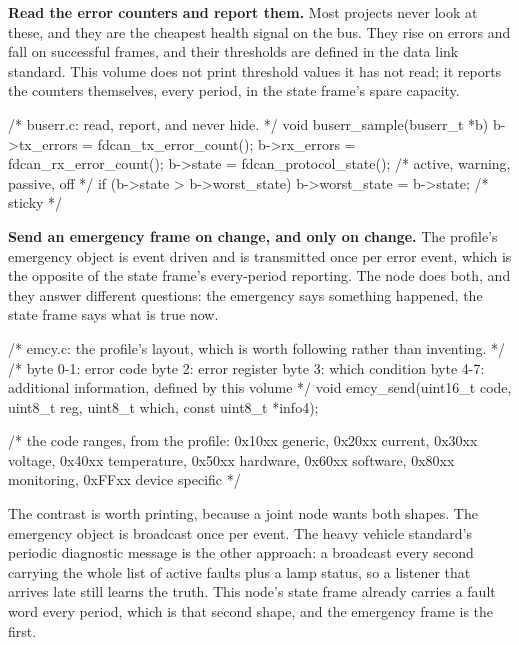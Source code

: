 \begin{steps}

\item \textbf{Read the error counters and report them.} Most projects never look
at these, and they are the cheapest health signal on the bus. They rise on
errors and fall on successful frames, and their thresholds are defined in the
data link standard. This volume does not print threshold values it has not read;
it reports the counters themselves, every period, in the state frame's spare
capacity.
\begin{ccode}
/* buserr.c: read, report, and never hide. */
void buserr_sample(buserr_t *b)
{
    b->tx_errors = fdcan_tx_error_count();
    b->rx_errors = fdcan_rx_error_count();
    b->state     = fdcan_protocol_state();   /* active, warning, passive, off */
    if (b->state > b->worst_state) b->worst_state = b->state;   /* sticky */
}
\end{ccode}

\item \textbf{Send an emergency frame on change, and only on change.} The
profile's emergency object is event driven and is transmitted once per error
event, which is the opposite of the state frame's every-period reporting. The
node does both, and they answer different questions: the emergency says
something happened, the state frame says what is true now.
\begin{ccode}
/* emcy.c: the profile's layout, which is worth following rather than inventing. */
/* byte 0-1: error code   byte 2: error register   byte 3: which condition
   byte 4-7: additional information, defined by this volume                */
void emcy_send(uint16_t code, uint8_t reg, uint8_t which, const uint8_t *info4);

/* the code ranges, from the profile: 0x10xx generic, 0x20xx current,
   0x30xx voltage, 0x40xx temperature, 0x50xx hardware, 0x60xx software,
   0x80xx monitoring, 0xFFxx device specific                              */
\end{ccode}
The contrast is worth printing, because a joint node wants both shapes. The
emergency object is broadcast once per event. The heavy vehicle standard's
periodic diagnostic message is the other approach: a broadcast every second
carrying the whole list of active faults plus a lamp status, so a listener that
arrives late still learns the truth. This node's state frame already carries a
fault word every period, which is that second shape, and the emergency frame is
the first.


\end{steps}
